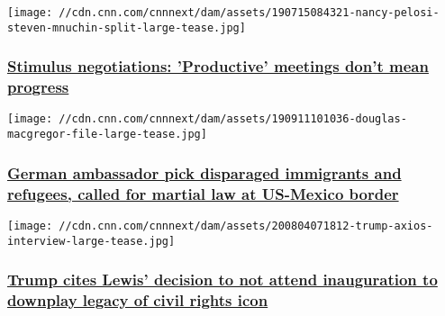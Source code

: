 \href{/2020/08/04/politics/congress-negotiations-state-of-play/index.html}{}

\texttt{[image: //cdn.cnn.com/cnnnext/dam/assets/190715084321-nancy-pelosi-steven-mnuchin-split-large-tease.jpg]}

\hypertarget{stimulus-negotiations-productive-meetings-dont-mean-progress-}{%
\subsubsection{\texorpdfstring{\href{/2020/08/04/politics/congress-negotiations-state-of-play/index.html}{Stimulus
negotiations: 'Productive' meetings don't mean progress
}}{Stimulus negotiations: 'Productive' meetings don't mean progress }}\label{stimulus-negotiations-productive-meetings-dont-mean-progress-}}

\href{/2020/08/04/politics/kfile-douglas-macgregor-german-ambassador-pick/index.html}{}

\texttt{[image: //cdn.cnn.com/cnnnext/dam/assets/190911101036-douglas-macgregor-file-large-tease.jpg]}

\hypertarget{german-ambassador-pick-disparaged-immigrants-and-refugees-called-for-martial-law-at-us-mexico-border}{%
\subsubsection{\texorpdfstring{\href{/2020/08/04/politics/kfile-douglas-macgregor-german-ambassador-pick/index.html}{German
ambassador pick disparaged immigrants and refugees, called for martial
law at US-Mexico
border}}{German ambassador pick disparaged immigrants and refugees, called for martial law at US-Mexico border}}\label{german-ambassador-pick-disparaged-immigrants-and-refugees-called-for-martial-law-at-us-mexico-border}}

\href{/2020/08/04/politics/trump-john-lewis-axios/index.html}{}

\texttt{[image: //cdn.cnn.com/cnnnext/dam/assets/200804071812-trump-axios-interview-large-tease.jpg]}

\hypertarget{trump-cites-lewis-decision-to-not-attend-inauguration-to-downplay-legacy-of-civil-rights-icon}{%
\subsubsection{\texorpdfstring{\href{/2020/08/04/politics/trump-john-lewis-axios/index.html}{Trump
cites Lewis' decision to not attend inauguration to downplay legacy of
civil rights
icon}}{Trump cites Lewis' decision to not attend inauguration to downplay legacy of civil rights icon}}\label{trump-cites-lewis-decision-to-not-attend-inauguration-to-downplay-legacy-of-civil-rights-icon}}

